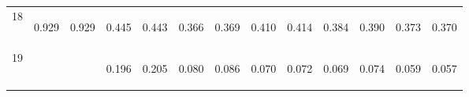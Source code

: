 \begin{center}
\begin{tabular}{lcccccccccccc}
18 & \begin{bf}0.929\end{bf} & \begin{rm}0.929\end{rm} & \begin{bf}0.445\end{bf} & \begin{rm}0.443\end{rm} & \begin{bf}0.366\end{bf} & \begin{rm}0.369\end{rm} & \begin{bf}0.410\end{bf} & \begin{rm}0.414\end{rm} & \begin{bf}0.384\end{bf} & \begin{rm}0.390\end{rm} & \begin{bf}0.373\end{bf} & \begin{rm}0.370\end{rm}\\
19 & \begin{bf}\end{bf} & \begin{rm}\end{rm} & \begin{bf}0.196\end{bf} & \begin{rm}0.205\end{rm} & \begin{bf}0.080\end{bf} & \begin{rm}0.086\end{rm} & \begin{bf}0.070\end{bf} & \begin{rm}0.072\end{rm} & \begin{bf}0.069\end{bf} & \begin{rm}0.074\end{rm} & \begin{bf}0.059\end{bf} & \begin{rm}0.057\end{rm}\\

\end{tabular}
\end{center}
